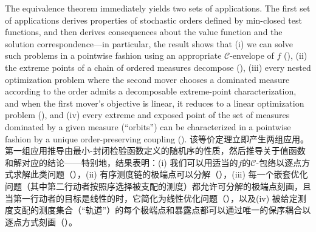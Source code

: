 \documentclass[12pt,letterpaper]{article}
\newenvironment{original}{\color{black}}{}
\newenvironment{translation}{\color{blue}}{}
\theoremstyle{plain}
\theoremstyle{definition}
\theoremstyle{remark}
\newcommand{\C}{\mathcal{C}}
\theoremstyle{definition}
\begin{document}
\begin{original}
The equivalence theorem immediately yields two sets of applications. The first set of applications derives properties of stochastic orders defined by min-closed test functions, and then derives consequences about the value function and the solution correspondence---in particular, the result shows that (i) we can solve such problems in a pointwise fashion using an appropriate $\C$-envelope of $f$ (), (ii) the extreme points of a chain of ordered measures decompose (), (iii) every nested optimization problem where the second mover chooses a dominated measure according to the order admits a decomposable extreme-point characterization, and when the first mover's objective is linear, it reduces to a linear optimization problem (), and (iv) every extreme and exposed point of the set of measures dominated by a given measure (``orbits'') can be characterized in a pointwise fashion by a unique order-preserving coupling ().
\end{original}
\begin{translation}
该等价定理立即产生两组应用。第一组应用推导由最小-封闭检验函数定义的随机序的性质，然后推导关于值函数和解对应的结论——特别地，结果表明：(i) 我们可以用适当的$f$的$\C$-包络以逐点方式求解此类问题（），(ii) 有序测度链的极端点可以分解（），(iii) 每一个嵌套优化问题（其中第二行动者按照序选择被支配的测度）都允许可分解的极端点刻画，且当第一行动者的目标是线性的时，它简化为线性优化问题（），以及(iv) 被给定测度支配的测度集合（``轨道''）的每个极端点和暴露点都可以通过唯一的保序耦合以逐点方式刻画（）。
\end{translation}
\end{document}
